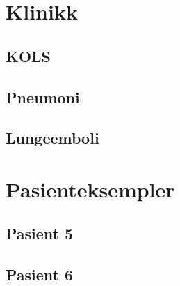 		\section{Klinikk}
			\subsection{KOLS}
			\subsection{Pneumoni}
			\subsection{Lungeemboli}
		\section{Pasienteksempler}
			\subsection{Pasient 5}
			\subsection{Pasient 6}
